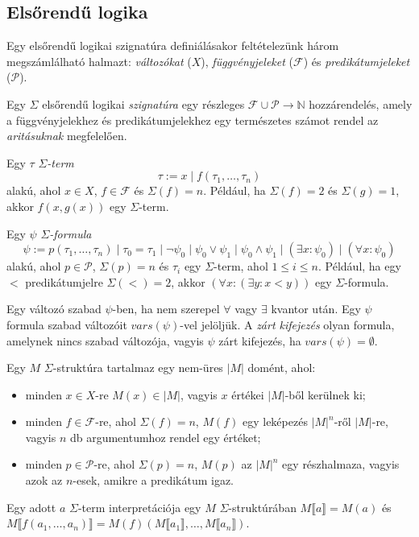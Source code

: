 \subsection{Elsőrendű logika}
Egy elsőrendű logikai szignatúra \cite{SMTTutorial} definiálásakor feltételezünk három megszámlálható halmazt: \emph{változókat} ($X$), \emph{függvényjeleket} ($\mathcal{F}$) és \emph{predikátumjeleket} ($\mathcal{P}$).

Egy $\Sigma$ elsőrendű logikai \emph{szignatúra} egy részleges $\mathcal{F} \cup \mathcal{P} \rightarrow \mathbb{N}$ hozzárendelés, amely a függvényjelekhez és predikátumjelekhez egy természetes számot rendel az \emph{aritásuknak} megfelelően.

Egy $\tau$ \emph{$\Sigma$-term}
\[
\tau := x \mid f(\tau_1,\dots,\tau_n)
\]
alakú, ahol $x \in X$, $f \in \mathcal{F}$ és $\Sigma(f) = n$. Például, ha $\Sigma(f) = 2$ és $\Sigma(g) = 1$, akkor $f(x,g(x))$ egy $\Sigma$-term.

Egy $\psi$ \emph{$\Sigma$-formula}
\[
\psi := p(\tau_1,\dots,\tau_n) \mid \tau_0 = \tau_1 \mid \neg \psi_0 \mid \psi_0 \vee \psi_1 \mid \psi_0 \wedge \psi_1 \mid (\exists x: \psi_0) \mid (\forall x: \psi_0)
\]
alakú, ahol $p \in \mathcal{P}$, $\Sigma(p) = n$ és $\tau_i$ egy $\Sigma$-term, ahol $1 \leq i \leq n$. Például, ha egy $<$ predikátumjelre $\Sigma(<) = 2$, akkor $(\forall x: (\exists y: x < y))$ egy $\Sigma$-formula.

Egy változó szabad $\psi$-ben, ha nem szerepel $\forall$ vagy $\exists$ kvantor után. Egy $\psi$ formula szabad változóit $vars(\psi)$-vel jelöljük. A \emph{zárt kifejezés} olyan formula, amelynek nincs szabad változója, vagyis $\psi$ zárt kifejezés, ha $vars(\psi) = \emptyset$.

Egy $M$ $\Sigma$-struktúra tartalmaz egy nem-üres $|M|$ domént, ahol:
\begin{itemize}
    \item minden $x \in X$-re $M(x) \in |M|$, vagyis $x$ értékei $|M|$-ből kerülnek ki;
    \item minden $f \in \mathcal{F}$-re, ahol $\Sigma(f) = n$, $M(f)$ egy leképezés $|M|^n$-ről $|M|$-re, vagyis $n$ db argumentumhoz rendel egy értéket; 
    \item minden $p \in \mathcal{P}$-re, ahol $\Sigma(p) = n$, $M(p)$ az $|M|^n$ egy részhalmaza, vagyis azok az $n$-esek, amikre a predikátum igaz.
\end{itemize}

Egy adott $a$ $\Sigma$-term interpretációja egy $M$ $\Sigma$-struktúrában $M\llbracket a \rrbracket = M(a)$ és $M\llbracket f(a_1,\dots,a_n) \rrbracket = M(f)(M\llbracket a_1\rrbracket,\dots,M\llbracket a_n \rrbracket)$.

